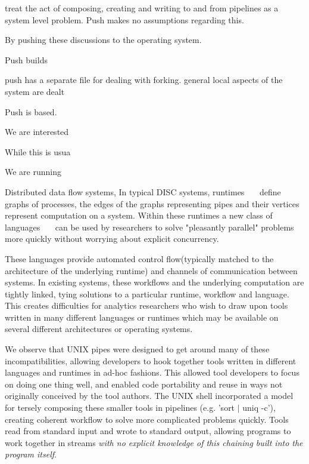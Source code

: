 \documentclass{sig-alt-release2}
\begin{document}
treat the act of composing, creating and writing to and from pipelines as a system level problem. Push makes no assumptions regarding this. 

By pushing these discussions to the operating system. 

Push builds 

push has a separate file for dealing with forking. general local aspects of the system are dealt 


Push is based. 


We are interested 

While this is usua

We are running 

Distributed data flow systems, 
In typical DISC systems, 
runtimes~\cite{dean2008msd}~\cite{bialecki:hfr}~\cite{isard2007ddd} define 
graphs of processes, the edges of the graphs representing 
pipes and their vertices represent computation on a system.  
Within these runtimes a new class of 
languages~\cite{pike2005idp}~\cite{yu2008dsg}~\cite{olston2008pln} can be used by researchers to solve "pleasantly parallel" 
problems more quickly without worrying about explicit concurrency.

These languages provide automated control flow(typically matched to the 
architecture of the underlying runtime) and channels of communication between 
systems.
In existing systems, these workflows and the underlying computation are 
tightly linked, tying solutions to a particular runtime, workflow and language.
This creates difficulties for analytics researchers who wish to draw upon
tools written in many different languages or runtimes which may be available
on several different architectures or operating systems.

We observe that UNIX pipes were designed to get around 
many of these incompatibilities, allowing developers to hook together tools 
written in different languages and runtimes in ad-hoc fashions.  
This allowed tool developers to focus on doing one thing well, and
enabled code portability and reuse in ways not originally conceived by
the tool authors.  The UNIX shell incorporated a model for tersely composing 
these smaller tools in pipelines (e.g. 'sort $|$ uniq -c'),  
creating coherent workflow to solve more complicated problems 
quickly. 
Tools read from standard input and wrote to standard output, allowing programs 
to work together in streams \emph{with no explicit knowledge of this chaining
built into the program itself}.
\end{document}
